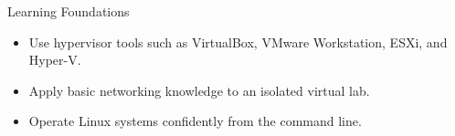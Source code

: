 \begin{frame}{Learning Foundations}
  \begin{itemize}
    \item Use hypervisor tools such as VirtualBox, VMware Workstation, ESXi, and Hyper-V.
    \item Apply basic networking knowledge to an isolated virtual lab.
    \item Operate Linux systems confidently from the command line.
  \end{itemize}
\end{frame}
